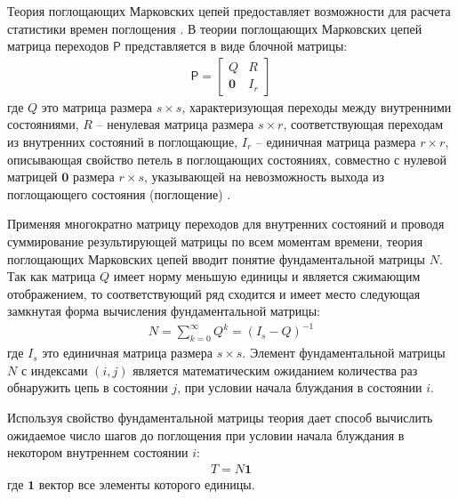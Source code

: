 Теория поглощающих Марковских цепей предоставляет возможности для расчета статистики времен поглощения \cite{kemeny_finite_1976}. В теории поглощающих Марковских цепей матрица переходов $\mathsf{P}$ представляется в виде блочной матрицы:
\begin{equation}
    \begin{aligned}
    \mathsf{P}=
      \begin{bmatrix}
        Q & R \\
        \textbf{0} & I_r
      \end{bmatrix}
    \label{eq:P}
    \end{aligned}
\end{equation}
где $Q$ это матрица размера $s \times s$, характеризующая переходы между внутренними состояниями, 
$R$ -- ненулевая матрица размера $s \times r$, соответствующая переходам из внутренних состояний в поглощающие, $I_r$ -- единичная матрица размера $r \times r$, описывающая свойство петель в поглощающих состояниях, совместно с нулевой матрицей $\textbf{0}$ размера $r \times s$, указывающей на невозможность выхода из поглощающего состояния (поглощение) \cite{kemeny_finite_1976}.

Применяя многократно матрицу переходов для внутренних состояний и проводя суммирование результирующей матрицы по всем моментам времени, теория поглощающих Марковских цепей вводит понятие фундаментальной матрицы $N$. Так как матрица $Q$ имеет норму меньшую единицы и является сжимающим отображением, то соответствующий ряд сходится и имеет место следующая замкнутая форма вычисления фундаментальной матрицы:
\begin{equation}
    \begin{aligned}
    N=\sum_{k=0}^{\infty} Q^k=(I_s-Q)^{-1}
    \label{eq:N}
    \end{aligned}
\end{equation}
где $I_s$ это единичная матрица размера $s \times s$. Элемент фундаментальной матрицы $N$ с индексами $(i, j)$ является математическим ожиданием количества раз обнаружить цепь в состоянии $j$, при условии начала блуждания в состоянии $i$.

Используя свойство фундаментальной матрицы теория дает способ вычислить ожидаемое число шагов до поглощения при условии начала блуждания в некотором внутреннем состоянии $i$:
\begin{equation}
    \begin{aligned}
    T=N\textbf{1}
    \label{eq:T}
    \end{aligned}
\end{equation}
где $\textbf{1}$ вектор все элементы которого единицы.

